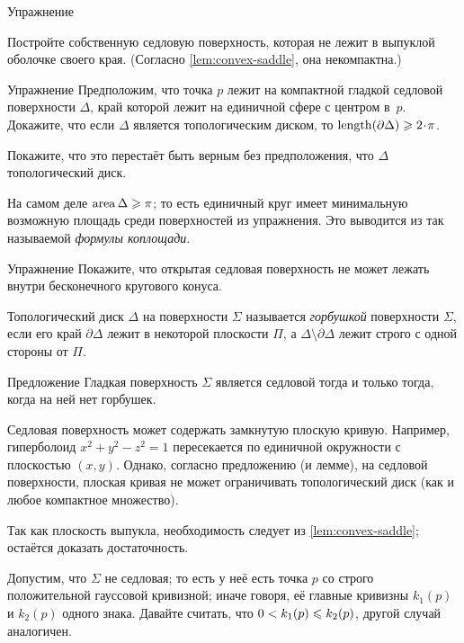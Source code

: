 \begin{thm}{Упражнение}\label{ex:proper-saddle}
{\sloppy 
Постройте собственную седловую поверхность, которая не лежит в выпуклой оболочке своего края.
(Согласно \ref{lem:convex-saddle}, она некомпактна.)

}
\end{thm}

\begin{thm}{Упражнение}\label{ex:length-of-bry}
Предположим, что точка $p$ лежит на компактной гладкой седловой поверхности $\Delta$, край которой лежит на единичной сфере с центром в~$p$.
Докажите, что если $\Delta$ является топологическим диском, то $\length(\partial\Delta)\ge 2\cdot\pi$.

Покажите, что это перестаёт быть верным без предположения, что $\Delta$ топологический диск.
\end{thm}

На самом деле $\mathop{\rm area}\nolimits \Delta\geqslant \pi$;
то есть единичный круг имеет минимальную возможную площадь среди поверхностей из упражнения.
Это выводится из так называемой \emph{формулы коплощади}.

\begin{thm}{Упражнение}\label{ex:circular-cone-saddle}
Покажите, что открытая седловая поверхность
не может лежать внутри бесконечного кругового конуса. 
\end{thm}

Топологический диск $\Delta$ на поверхности $\Sigma$ называется \emph{горбушкой} поверхности $\Sigma$, если его край $\partial\Delta$ лежит в некоторой плоскости $\Pi$, а $\Delta \setminus \partial \Delta$ лежит строго с одной стороны от $\Pi$.

\begin{thm}{Предложение}\label{prop:hat}
Гладкая поверхность $\Sigma$ является седловой тогда и только тогда, когда на ней нет горбушек.
\end{thm}

Седловая поверхность может содержать замкнутую плоскую кривую.
Например, гиперболоид $x^2+y^2-z^2=1$ пересекается по единичной окружности с плоскостью $(x,y)$.
Однако, согласно предложению (и лемме), на седловой поверхности, плоская кривая не может ограничивать топологический диск (как и любое компактное множество).


Так как плоскость выпукла, необходимость следует из \ref{lem:convex-saddle};
остаётся доказать достаточность.

Допустим, что $\Sigma$ не седловая; то есть у неё есть точка $p$ со строго положительной гауссовой кривизной;
иначе говоря, её главные кривизны $k_1(p)$ и $k_2(p)$ одного знака.
Давайте считать, что $0 < k_1(p) \z\le k_2(p)$, другой случай аналогичен.

